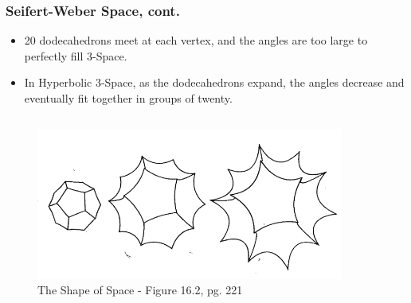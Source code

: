 \documentclass[13pt]{beamer}
\begin{document}
\begin{frame}
\frametitle{Seifert-Weber Space, cont.}
  \begin{itemize}
    \item 20 dodecahedrons meet at each vertex, and the angles are too large to perfectly fill 3-Space.
    \item In Hyperbolic 3-Space, as the dodecahedrons expand, the angles decrease and eventually fit together in groups of twenty.
  \end{itemize}

  \begin{columns}[c] %
     \centering
      \begin{figure}
        \includegraphics[height=5cm]{./img/seifertspace}
        \caption{The Shape of Space - Figure 16.2, pg. 221}
      \end{figure}
  \end{columns}
\end{frame}

\end{document}
